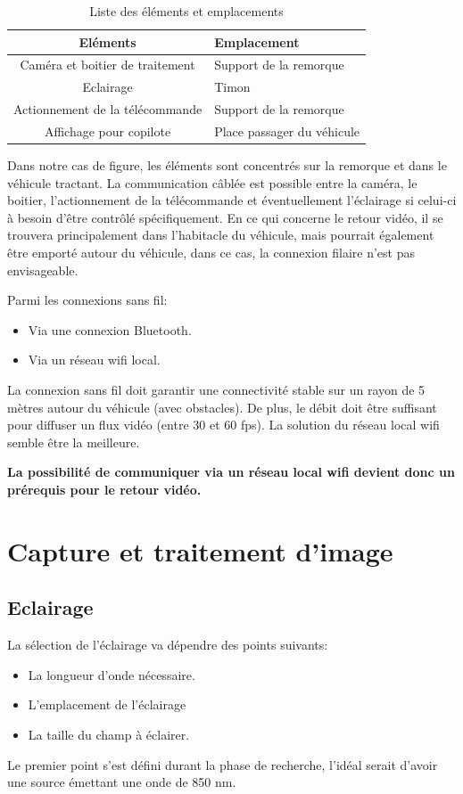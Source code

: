 \begin{table}[h]
    \begin{center}
        \caption{Liste des éléments et emplacements}
        \begin{tabular}{|c|l|}
            Eléments                        & Emplacement                \\ \hline
            Caméra et boitier de traitement & Support de la remorque     \\
            Eclairage                       & Timon                      \\
            Actionnement de la télécommande & Support de la remorque     \\
            Affichage pour copilote         & Place passager du véhicule
        \end{tabular}
    \end{center}
\end{table}

Dans notre cas de figure, les éléments sont concentrés sur la remorque et dans le véhicule tractant. La communication câblée est possible
entre la caméra, le boitier, l'actionnement de la télécommande et éventuellement l'éclairage si celui-ci à besoin d'être contrôlé spécifiquement.
En ce qui concerne le retour vidéo, il se trouvera principalement dans l'habitacle du véhicule, mais pourrait également être emporté autour du véhicule,
dans ce cas, la connexion filaire n'est pas envisageable.

Parmi les connexions sans fil:
\begin{itemize}
    \item Via une connexion Bluetooth.
    \item Via un réseau \Gls{wifi} local.
\end{itemize}
La connexion sans fil doit garantir une connectivité stable sur un rayon de 5 mètres autour du véhicule (avec obstacles). De plus, le débit doit être
suffisant pour diffuser un flux vidéo (entre 30 et 60 \Gls{fps}). La solution du réseau local \Gls{wifi} semble être la meilleure.

\textbf{La possibilité de communiquer via un réseau local \Gls{wifi} devient donc un prérequis pour le retour vidéo.}
\newpage
\section{Capture et traitement d'image}
\subsection{Eclairage}
La sélection de l'éclairage va dépendre des points suivants:
\begin{itemize}
    \item La longueur d'onde nécessaire.
    \item L'emplacement de l'éclairage
    \item La taille du champ à éclairer.
\end{itemize}
Le premier point s'est défini durant la phase de recherche, l'idéal serait d'avoir une source émettant une onde de 850 \si{\nano\metre}.


